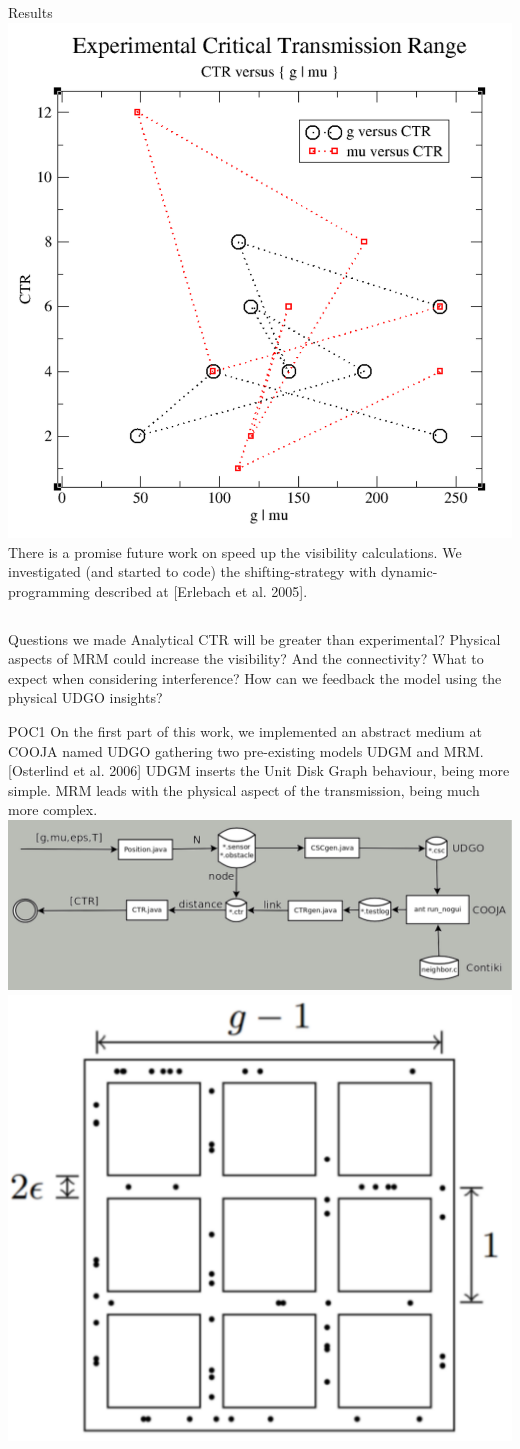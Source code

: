 \documentclass[final,hyperref={pdfpagelabels=false}]{beamer}
\begin{document}
\begin{frame}{}
\begin{block}{Results}
      \includegraphics[width=0.22\linewidth]{ctr_exp}
      \newline
      There is a promise future work on speed up the visibility calculations.
      We investigated (and started to code) the shifting-strategy with dynamic-programming described at [Erlebach et al. 2005].
    \end{block}
    \vfill
    \vfill
    \vfill
    \begin{columns}[t]
      \begin{column}{.48\linewidth}
        \begin{block}{\large Questions we made}
          \centering
            Analytical CTR will be greater than experimental? \newline
            Physical aspects of MRM could increase the visibility? \newline
            And the connectivity? What to expect when considering interference? \newline
            How can we feedback the model using the physical UDGO insights?
        \end{block}
        \begin{block}{POC1}
          \centering
          On the first part of this work, we implemented an abstract medium at
          COOJA named UDGO gathering two pre-existing models UDGM and MRM.
          [Osterlind et al. 2006]
          UDGM inserts the Unit Disk Graph behaviour, being more simple. MRM leads
          with the physical aspect of the transmission, being much more complex.\newline
          \includegraphics[width=0.9\linewidth]{sim-cycle}\newline
          \includegraphics[width=0.35\linewidth]{grid}

\end{block}
\end{column}
\end{columns}
\end{frame}
\end{document}
